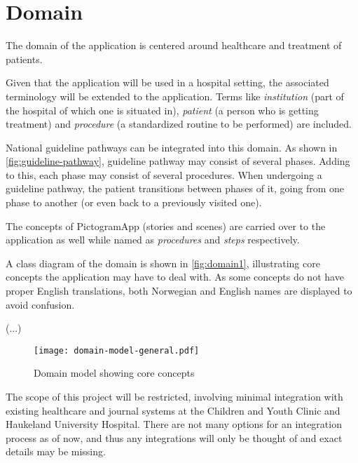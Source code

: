 
\section{Domain}
\label{sec:domain}

The domain of the application is centered around healthcare and treatment of patients.

Given that the application will be used in a hospital setting, the associated terminology will be extended to the application. Terms like \emph{institution} (part of the hospital of which one is situated in), \emph{patient} (a person who is getting treatment) and \emph{procedure} (a standardized routine to be performed) are included.

National guideline pathways can be integrated into this domain. As shown in \autoref{fig:guideline-pathway}, guideline pathway may consist of several phases. Adding to this, each phase may consist of several procedures. When undergoing a guideline pathway, the patient transitions between phases of it, going from one phase to another (or even back to a previously visited one).

The concepts of PictogramApp (stories and scenes) are carried over to the application as well while named as \emph{procedures} and \emph{steps} respectively.

A class diagram of the domain is shown in \autoref{fig:domain1}, illustrating core concepts the application may have to deal with. As some concepts do not have proper English translations, both Norwegian and English names are displayed to avoid confusion.

(...)


\begin{figure}
    \centering
    \texttt{[image: domain-model-general.pdf]}
    \caption{Domain model showing core concepts}
    \label{fig:domain1}
\end{figure}

The scope of this project will be restricted, involving minimal integration with existing healthcare and journal systems at the Children and Youth Clinic and Haukeland University Hospital. There are not many options for an integration process as of now, and thus any integrations will only be thought of and exact details may be missing.

